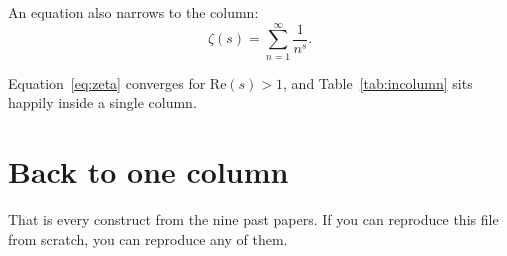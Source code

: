 \documentclass[11pt,a4paper]{article}
\theoremstyle{definition}                   %
\begin{document}
An equation also narrows to the column:
\begin{equation}
    \zeta(s) = \sum_{n=1}^{\infty} \frac{1}{n^s}.
    \label{eq:zeta}
\end{equation}

Equation~\eqref{eq:zeta} converges for $\mathrm{Re}(s) > 1$, and
Table~\ref{tab:incolumn} sits happily inside a single column.

\onecolumn

\section*{Back to one column}

That is every construct from the nine past papers. If you can reproduce this
file from scratch, you can reproduce any of them.
\end{document}
